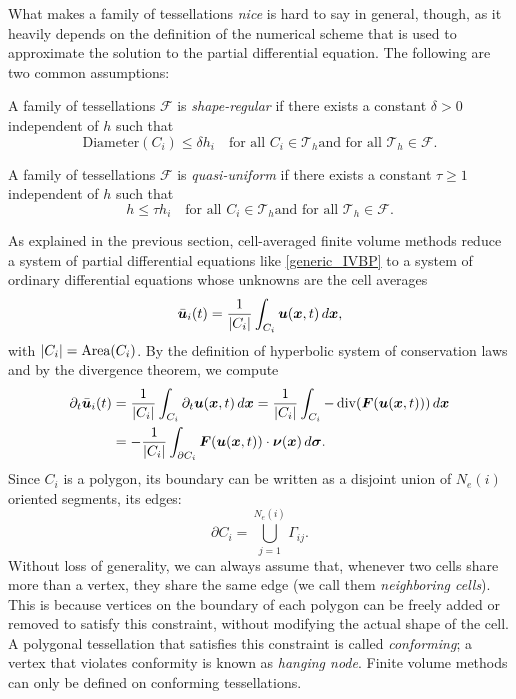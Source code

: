 What makes a family of tessellations \emph{nice} is hard to say in
general, though, as it heavily depends on the definition of the
numerical scheme that is used to approximate the solution to
the partial differential equation. The following are two common assumptions:

\begin{defi} \label{defi:shape-regularity}
A family of tessellations $\mathcal{F}$ is \emph{shape-regular}
if there exists a constant $\delta > 0$ independent of $h$ such that
\[
\text{Diameter}(C_i) \leq \delta h_i
\quad \text{for all $C_i \in \mathcal{T}_{h}$
and for all $\mathcal{T}_{h} \in \mathcal{F}$}.
\]
\end{defi}

\begin{defi}
A family of tessellations $\mathcal{F}$ is \emph{quasi-uniform}
if there exists a constant $\tau \geq 1$ independent of $h$ such that
\[
h \leq \tau h_i
\quad \text{for all $C_i \in \mathcal{T}_{h}$
and for all $\mathcal{T}_{h} \in \mathcal{F}$}.
\]
\end{defi}

As explained in the previous section, cell-averaged finite volume methods
reduce a system of partial differential equations like \eqref{generic_IVBP}
to a system of ordinary differential equations whose unknowns are the cell averages
\[
\bar{\bm{u}}_{i}(t)=\frac{1}{\left\lvert C_{i}\right\rvert} \int_{C_{i}} \bm{u}(\bm{x},t) \, d\bm{x},
\]
with $\left\lvert C_{i}\right\rvert = \text{Area}(C_{i})$. By the definition of hyperbolic system
of conservation laws and by the divergence theorem, we compute %
\begin{equation} \label{FVM_divergence}
\begin{aligned}
\partial_{t} \bar{\bm{u}}_{i}(t)
&= \frac{1}{\left\lvert C_i\right\rvert} \int_{C_{i}} \partial_{t} \bm{u}(\bm{x},t) \, d\bm{x}
 = \frac{1}{\left\lvert C_i\right\rvert} \int_{C_{i}} -\operatorname{div}(\bm{F}(\bm{u}(\bm{x},t))) \, d\bm{x} \\
&= -\frac{1}{\left\lvert C_i\right\rvert} \int_{\partial C_{i}}
	\bm{F}(\bm{u}(\bm{x},t)) \cdot \bm{\nu}(\bm{x}) \, d\bm{\sigma}.
\end{aligned}
\end{equation}
Since $C_{i}$ is a polygon, its boundary can be written as a disjoint union
of $N_{e}(i)$ oriented segments, its edges:
\[
\partial C_{i}=\bigcup_{j=1}^{N_{e}(i)} \Gamma_{ij}.
\]
Without loss of generality, we can always assume that, whenever two cells
share more than a vertex, they share the same edge (we call them
\emph{neighboring cells}).
This is because vertices on the boundary of each polygon can be freely
added or removed to satisfy this constraint,
without modifying the actual shape of the cell.
A polygonal tessellation that satisfies this constraint is called
\emph{conforming}; a vertex that violates conformity is known as
\emph{hanging node}. Finite volume methods can only be defined on
conforming tessellations.

